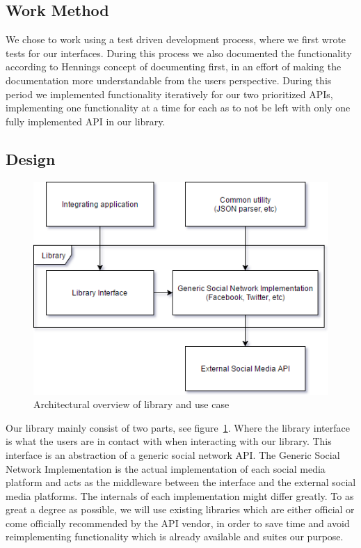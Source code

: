 \documentclass{sigchi-alternate}
\begin{document}
\subsection{Work Method}
We chose to work using a test driven development process, where we first wrote tests for our interfaces. During this process we also documented the functionality according to 
Hennings\autocite{Henning:2007:ADM:1255421.1255422} concept of documenting first, in an effort of making the documentation more understandable from the users perspective. During this
period we implemented functionality iteratively for our two prioritized APIs, implementing one functionality at a time for each as to not be left with only one fully implemented API in our library.

\subsection{Design}
\begin{figure}
	\includegraphics[width=\columnwidth]{LibraryImplementation.png}
	\caption{Architectural overview of library and use case}
	\label{fig:architecturalOverview}
\end{figure}
Our library mainly consist of two parts, see figure~\ref{fig:architecturalOverview}. Where the library interface is what the users are in contact with when interacting with our library. This interface is an abstraction
of a generic social network API. The Generic Social Network Implementation is the actual implementation of each social media platform and acts as the middleware between the interface and the 
external social media platforms.
The internals of each implementation might differ greatly. To as great a degree as possible, we will use existing libraries which are either official or come officially recommended by the API vendor, in order to save time
and avoid reimplementing functionality which is already available and suites our purpose.
\end{document}
